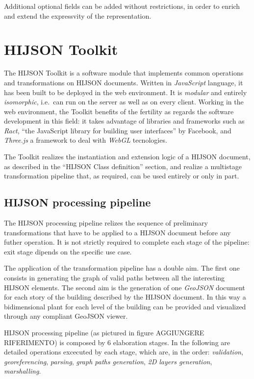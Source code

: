 \documentclass{sig-alternate}
\begin{document}
Additional optional fields can be added without restrictions, in order to enrich and extend the
expressvity of the representation.

\section{HIJSON Toolkit}\label{hijson-toolkit}

The HIJSON Toolkit is a software module that implements common
operations and transformations on HIJSON documents. Written in
\emph{JavaScript} language, it has been built to be deployed in the web
environment. It is \emph{modular} and entirely \emph{isomorphic},
i.e.~can run on the server as well as on every client. Working in the
web environment, the Toolkit benefits of the fertility as regards the
software development in this field: it takes advantage of libraries and
frameworks such as \emph{Ract}, ``the JavaScript library for building
user interfaces'' by Facebook, and \emph{Three.js} a framework to deal
with \emph{WebGL} tecnologies.

The Toolkit realizes the instantiation and extension logic of a HIJSON
document, as described in the ``HIJSON Class definition'' section, and
realize a multistage transformation pipeline that, as required, can be
used entirely or only in part.

\subsection{HIJSON processing pipeline}\label{hijson-processing-pipeline}

The HIJSON processing pipeline relizes the sequence of preliminary
transformations that have to be applied to a HIJSON document before any
futher operation. It is not strictly required to complete each stage of
the pipeline: exit stage dipends on the specific use case.

The application of the transformation pipeline has a double aim. The
first one consists in generating the graph of valid paths between all
the interesting HIJSON elements. The second aim is the generation of one
\emph{GeoJSON} document for each story of the building described by the
HIJSON document. In this way a bidimensional plant for each level of the
building can be provided and visualized through any compliant GeoJSON
viewer.

HIJSON processing pipeline (as pictured in figure AGGIUNGERE
RIFERIMENTO) is composed by 6 elaboration stages. In the following are
detailed operations excecuted by each stage, which are, in the order:
\emph{validation}, \emph{georeferencing}, \emph{parsing}, \emph{graph
paths generation}, \emph{2D layers generation}, \emph{marshalling}.
\end{document}
